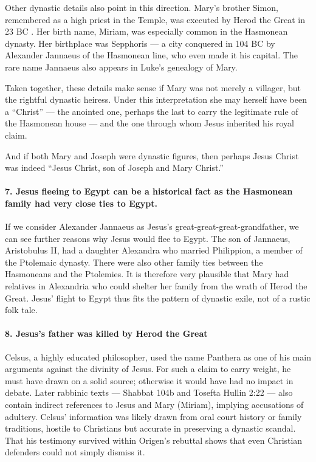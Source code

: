 Other dynastic details also point in this direction.
Mary’s brother Simon, remembered as a high priest in the Temple, was executed by Herod the Great in 23 BC .
Her birth name, Miriam, was especially common in the Hasmonean dynasty.
Her birthplace was Sepphoris — a city conquered in 104 BC by Alexander Jannaeus of the Hasmonean line, who even made it his capital.
The rare name Jannaeus also appears in Luke’s genealogy of Mary.

Taken together, these details make sense if Mary was not merely a villager, but the rightful dynastic heiress.
Under this interpretation she may herself have been a “Christ” — the anointed one, perhaps the last to carry the legitimate rule of the Hasmonean house — and the one through whom Jesus inherited his royal claim.

And if both Mary and Joseph were dynastic figures, then perhaps Jesus Christ was indeed “Jesus Christ, son of Joseph and Mary Christ.”

\paragraph{7.
Jesus fleeing to Egypt can be a historical fact as the Hasmonean family had very close ties to Egypt.}\label{par:jesus-fleeing-to-egypt-can-be-a-historical-fact-as-the-hasmonean-family-had-very-close-ties-to-egypt.}

If we consider Alexander Jannaeus as Jesus’s great-great-great-grandfather, we can see further reasons why Jesus would flee to Egypt.
The son of Jannaeus, Aristobulus II, had a daughter Alexandra who married Philippion, a member of the Ptolemaic dynasty.
There were also other family ties between the Hasmoneans and the Ptolemies.
It is therefore very plausible that Mary had relatives in Alexandria who could shelter her family from the wrath of Herod the Great.
Jesus’ flight to Egypt thus fits the pattern of dynastic exile, not of a rustic folk tale.

\paragraph{8.
Jesus's father was killed by Herod the Great}\label{par:jesuss-father-was-killed-by-herod-the-great}

Celsus, a highly educated philosopher, used the name Panthera as one of his main arguments against the divinity of Jesus.
For such a claim to carry weight, he must have drawn on a solid source; otherwise it would have had no impact in debate.
Later rabbinic texts — Shabbat 104b and Tosefta Hullin 2:22 — also contain indirect references to Jesus and Mary (Miriam), implying accusations of adultery.
Celsus’ information was likely drawn from oral court history or family traditions, hostile to Christians but accurate in preserving a dynastic scandal.
That his testimony survived within Origen’s rebuttal shows that even Christian defenders could not simply dismiss it.

